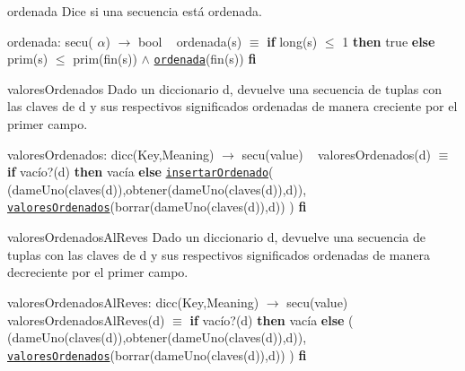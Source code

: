 \begin{DoxyParagraph}{ordenada}
Dice si una secuencia está ordenada.

ordenada\+: secu( $\alpha$) $\to$ bool ~\newline
 ordenada(s) $\equiv$ {\bfseries if} long(s) $\leq$ 1 {\bfseries then} true {\bfseries else} prim(s) $\leq$ prim(fin(s)) $\land$ \href{axiomas.html#ordenada}{\tt ordenada}(fin(s)) {\bfseries fi} 


\end{DoxyParagraph}
\begin{DoxyParagraph}{valores\+Ordenados}
Dado un diccionario d, devuelve una secuencia de tuplas con las claves de d y sus respectivos significados ordenadas de manera creciente por el primer campo.

valores\+Ordenados\+: dicc(\+Key,\+Meaning) $\to$ secu(value) ~\newline
 valores\+Ordenados(d) $\equiv$ {\bfseries if} vacío?(d) {\bfseries then} vacía {\bfseries else} \href{axiomas.html#insertarOrdenado}{\tt insertar\+Ordenado}( (dame\+Uno(claves(d)),obtener(dame\+Uno(claves(d)),d)), \href{axiomas.html#valoresOrdenados}{\tt valores\+Ordenados}(borrar(dame\+Uno(claves(d)),d)) ) {\bfseries fi} 


\end{DoxyParagraph}
\begin{DoxyParagraph}{valores\+Ordenados\+Al\+Reves}
Dado un diccionario d, devuelve una secuencia de tuplas con las claves de d y sus respectivos significados ordenadas de manera decreciente por el primer campo.

valores\+Ordenados\+Al\+Reves\+: dicc(\+Key,\+Meaning) $\to$ secu(value) ~\newline
 valores\+Ordenados\+Al\+Reves(d) $\equiv$ {\bfseries if} vacío?(d) {\bfseries then} vacía {\bfseries else} ( (dame\+Uno(claves(d)),obtener(dame\+Uno(claves(d)),d)), \href{axiomas.html#valoresOrdenados}{\tt valores\+Ordenados}(borrar(dame\+Uno(claves(d)),d)) ) {\bfseries fi} 
\end{DoxyParagraph}
